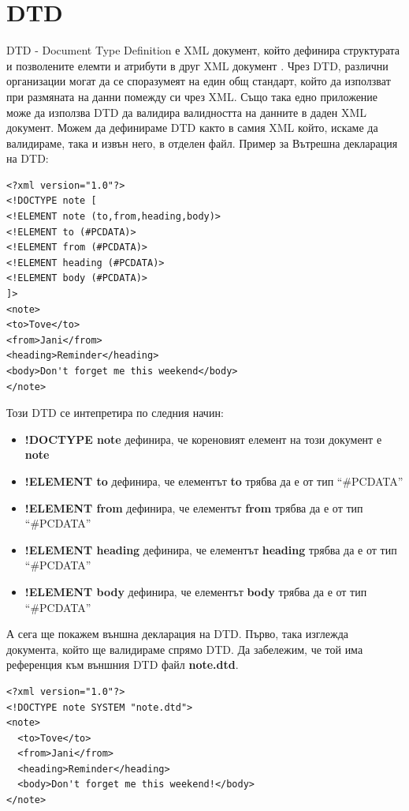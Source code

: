 \documentclass[11pt]{article} %
\begin{document}
\section{DTD}
DTD - Document Type Definition е XML документ, който дефинира структурата и позволените елемти и атрибути в друг XML документ . Чрез DTD, различни организации могат да се споразумеят на един общ стандарт, който да използват при размяната на данни помежду си чрез XML. Също така едно приложение може да използва DTD да валидира валидността на данните в даден XML документ. Можем да дефинираме DTD както в самия XML който, искаме да валидираме, така и извън него, в отделен файл. Пример за Вътрешна декларация на DTD:
\begin{verbatim}
<?xml version="1.0"?>
<!DOCTYPE note [
<!ELEMENT note (to,from,heading,body)>
<!ELEMENT to (#PCDATA)>
<!ELEMENT from (#PCDATA)>
<!ELEMENT heading (#PCDATA)>
<!ELEMENT body (#PCDATA)>
]>
<note>
<to>Tove</to>
<from>Jani</from>
<heading>Reminder</heading>
<body>Don't forget me this weekend</body>
</note>
\end{verbatim}

Този DTD се интепретира по следния начин:
\begin{itemize}[noitemsep]
	\item \textbf{!DOCTYPE note} дефинира, че кореновият елемент на този документ е \textbf{note}
	\item \textbf{!ELEMENT to} дефинира, че елементът \textbf{to} трябва да е от тип \enquote{\#PCDATA}
	\item \textbf{!ELEMENT from} дефинира, че елементът \textbf{from} трябва да е от тип \enquote{\#PCDATA}
	\item \textbf{!ELEMENT heading} дефинира, че елементът \textbf{heading} трябва да е от тип \enquote{\#PCDATA}
	\item \textbf{!ELEMENT body} дефинира, че елементът \textbf{body} трябва да е от тип \enquote{\#PCDATA}
\end{itemize}
 
 А сега ще покажем външна декларация на DTD. Първо, така изглежда документа, който ще валидираме спрямо DTD. Да забележим, че той има референция към външния DTD файл \textbf{note.dtd}.\\
\begin{verbatim}
<?xml version="1.0"?>
<!DOCTYPE note SYSTEM "note.dtd">
<note>
  <to>Tove</to>
  <from>Jani</from>
  <heading>Reminder</heading>
  <body>Don't forget me this weekend!</body>
</note>
\end{verbatim}
\end{document}
